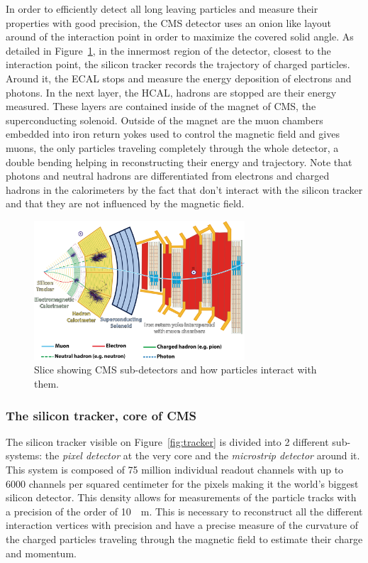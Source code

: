 	In order to efficiently detect all long leaving particles and measure their properties with good precision, the CMS detector uses an onion like layout around of the interaction point in order to maximize the covered solid angle. As detailed in Figure~\ref{fig:CMS-slice}, in the innermost region of the detector, closest to the interaction point, the silicon tracker records the trajectory of charged particles. Around it, the \acf{ECAL} stops and measure the energy deposition of electrons and photons. In the next layer, the \acf{HCAL}, hadrons are stopped are their energy measured. These layers are contained inside of the magnet of CMS, the superconducting solenoid. Outside of the magnet are the muon chambers embedded into iron return yokes used to control the magnetic field and gives muons, the only particles traveling completely through the whole detector, a double bending helping in reconstructing their energy and trajectory. Note that photons and neutral hadrons are differentiated from electrons and charged hadrons in the calorimeters by the fact  that don't interact with the silicon tracker and that they are not influenced by the magnetic field.
	
	\begin{figure}[H]
		\centering
		\includegraphics[width=0.7\textwidth]{fig/chapt2/CMS_slice.png}
		\caption{\label{fig:CMS-slice} Slice showing CMS sub-detectors and how particles interact with them.}
	\end{figure}
	
		\subsubsection{The silicon tracker, core of CMS}
		\label{chapt2:sssec:tracker}
	
	The silicon tracker visible on Figure~\ref{fig:tracker} is divided into 2 different sub-systems: the \textit{pixel detector} at the very core and the \textit{microstrip detector} around it. This system is composed of 75 million individual readout channels with up to 6000 channels per squared centimeter for the pixels making it the world's biggest silicon detector. This density allows for measurements of the particle tracks with a precision of the order of \SI{10}{\mu m}. This is necessary to reconstruct all the different interaction vertices with precision and have a precise measure of the curvature of the charged particles traveling through the magnetic field to estimate their charge and momentum.
	
